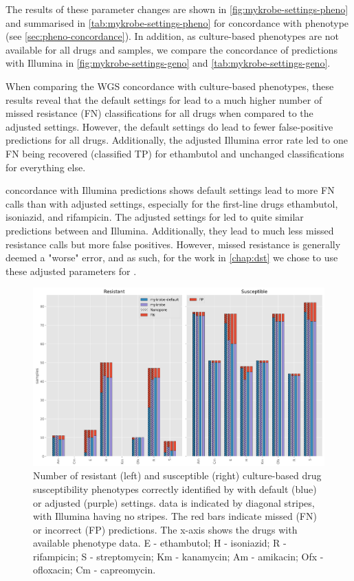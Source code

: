The results of these parameter changes are shown in \autoref{fig:mykrobe-settings-pheno} and summarised in \autoref{tab:mykrobe-settings-pheno} for concordance with phenotype (see \autoref{sec:pheno-concordance}). In addition, as culture-based phenotypes are not available for all drugs and samples, we compare the concordance of \ont{} predictions with Illumina in \autoref{fig:mykrobe-settings-geno} and \autoref{tab:mykrobe-settings-geno}.

When comparing the WGS concordance with culture-based phenotypes, these results reveal that the default \ont{} settings for \mykrobe{} lead to a much higher number of missed resistance (FN) classifications for all drugs when compared to the adjusted settings. However, the default settings do lead to fewer false-positive predictions for all drugs. Additionally, the adjusted Illumina error rate led to one FN being recovered (classified TP) for ethambutol and unchanged classifications for everything else.

\ont{} concordance with Illumina predictions shows default settings lead to more FN calls than with adjusted settings, especially for the first-line drugs ethambutol, isoniazid, and rifampicin. The adjusted settings for \mykrobe{} led to quite similar predictions between \ont{} and Illumina. Additionally, they lead to much less \ont{} missed resistance calls but more false positives. However, missed resistance is generally deemed a "worse" error, and as such, for the work in \autoref{chap:dst} we chose to use these adjusted parameters for \mykrobe{}.

\begin{figure}
\begin{center}
\includegraphics[width=0.90\columnwidth]{Appendix2/Figs/mykrobe_settings_pheno.png}
\caption{{Number of resistant (left) and susceptible (right) culture-based drug susceptibility phenotypes correctly identified by \mykrobe{} with default (blue) or adjusted (purple) settings. \ont{} data is indicated by diagonal stripes, with Illumina having no stripes. The red bars indicate missed (FN) or incorrect (FP) predictions. The x-axis shows the drugs with available phenotype data. E - ethambutol; H - isoniazid; R - rifampicin; S - streptomycin; Km - kanamycin; Am - amikacin; Ofx - ofloxacin; Cm - capreomycin.
{\label{fig:mykrobe-settings-pheno}}
}}
\end{center}
\end{figure}

